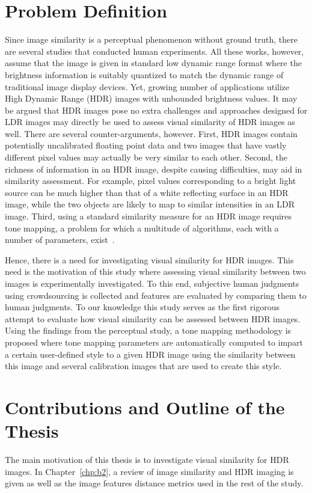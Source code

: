 \section{ Problem Definition}
Since image similarity is a perceptual phenomenon without ground truth, there are several studies that conducted human experiments. All these works, however, assume that the image is given in standard low dynamic range format where the brightness information is suitably quantized to match the dynamic range of traditional image display devices. Yet, growing number of applications utilize High Dynamic Range (HDR) images with unbounded brightness values. It may be argued that HDR images pose no extra challenges and approaches designed for LDR images may directly be used to assess visual similarity of HDR images as well. There are several counter-arguments, however. First, HDR images contain potentially uncalibrated floating point data and two images that have vastly different pixel values may actually be very similar to each other. Second, the richness of information in an HDR image, despite causing difficulties, may aid in similarity assessment. For example, pixel values corresponding to a bright light source can be much higher than that of a white reflecting surface in an HDR image, while the two objects are likely to map to similar intensities in an LDR image. Third, using a standard similarity measure for an HDR image requires tone mapping, a problem for which a multitude of algorithms, each with a number of parameters, exist~\cite{yeganeh2012objective}.

Hence, there is a need for investigating visual similarity for HDR images. This need is the motivation of this study where assessing visual similarity between two images is experimentally investigated. To this end, subjective human judgments using crowdsourcing is collected and features are evaluated by comparing them to human judgments. To our knowledge this study serves as the first rigorous attempt to evaluate how visual similarity can be assessed between HDR images. Using the findings from the perceptual study, a tone mapping methodology is proposed where tone mapping parameters are automatically computed to impart a certain user-defined style to a given HDR image using the similarity between this image and several calibration images that are used to create this style.

\section{Contributions and Outline of the Thesis}
The main motivation of this thesis is to investigate visual similarity for HDR images. In Chapter~\ref{chp:b2}, a review of image similarity and HDR imaging is given as well as the image features distance metrics used in the rest of the study.


